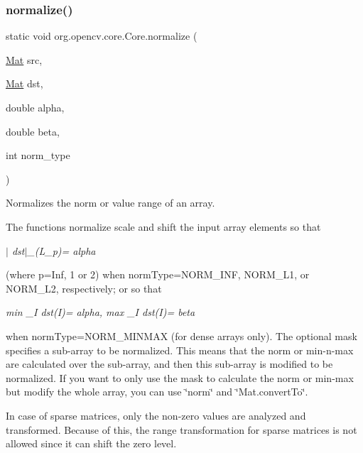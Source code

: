 \subsubsection{\texorpdfstring{normalize()}{normalize()}\hspace{0.1cm}{\footnotesize\ttfamily [3/4]}}
{\footnotesize\ttfamily static void org.\+opencv.\+core.\+Core.\+normalize (\begin{DoxyParamCaption}\item[{\mbox{\hyperlink{classorg_1_1opencv_1_1core_1_1_mat}{Mat}}}]{src,  }\item[{\mbox{\hyperlink{classorg_1_1opencv_1_1core_1_1_mat}{Mat}}}]{dst,  }\item[{double}]{alpha,  }\item[{double}]{beta,  }\item[{int}]{norm\+\_\+type }\end{DoxyParamCaption})\hspace{0.3cm}{\ttfamily [static]}}

Normalizes the norm or value range of an array.

The functions {\ttfamily normalize} scale and shift the input array elements so that

{\itshape $\vert$ dst$\vert$\+\_\+(L\+\_\+p)= alpha}

(where p=Inf, 1 or 2) when {\ttfamily norm\+Type=N\+O\+R\+M\+\_\+\+I\+NF}, {\ttfamily N\+O\+R\+M\+\_\+\+L1}, or {\ttfamily N\+O\+R\+M\+\_\+\+L2}, respectively; or so that

{\itshape min \+\_\+I dst(\+I)= alpha, max \+\_\+I dst(\+I)= beta}

when {\ttfamily norm\+Type=N\+O\+R\+M\+\_\+\+M\+I\+N\+M\+AX} (for dense arrays only). The optional mask specifies a sub-\/array to be normalized. This means that the norm or min-\/n-\/max are calculated over the sub-\/array, and then this sub-\/array is modified to be normalized. If you want to only use the mask to calculate the norm or min-\/max but modify the whole array, you can use \char`\"{}norm\char`\"{} and \char`\"{}\+Mat.\+convert\+To\char`\"{}.

In case of sparse matrices, only the non-\/zero values are analyzed and transformed. Because of this, the range transformation for sparse matrices is not allowed since it can shift the zero level.


